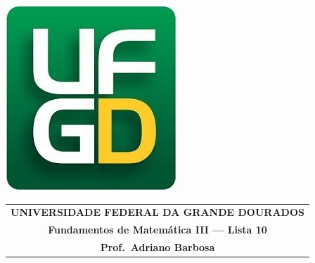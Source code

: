 \documentclass[a4paper,5pt]{amsbook}
\begin{document}
\thispagestyle{empty}
\pagestyle{empty}
\begin{minipage}[h]{0.14\textwidth}
	\includegraphics[scale=0.24]{../ufgd.png}
\end{minipage}
\begin{minipage}[h]{\textwidth}
\begin{tabular}{c}
{{\bf UNIVERSIDADE FEDERAL DA GRANDE DOURADOS}}\\
    {{\bf Fundamentos de Matem\'{a}tica III --- Lista 10}}\\
{{\bf Prof.\ Adriano Barbosa}}\\
\end{tabular}
\vspace{-0.45cm}
%
\end{minipage}

\end{document}
